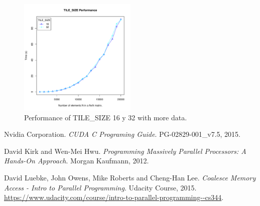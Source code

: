 \documentclass[a4paper,10pt]{scrartcl}
\begin{document}
\begin{enumerate}
 \begin{figure}
 \centering
 \includegraphics[width=0.5\textwidth]{./TilesizePerformance_1K-20K}
 \caption{Performance of TILE\_SIZE 16 y 32 with more data.}\label{fig:NTVsT_50-1K}
 \end{figure}
 
\end{enumerate}

\begin{thebibliography}{9}
Nvidia Corporation.
\textit{CUDA C Programing Guide}. 
PG-02829-001\_v7.5, 2015.
 
David Kirk and Wen-Mei Hwu.
\textit{Programming Massively Parallel Processors: A Hands-On Approach}. 
Morgan Kaufmann, 2012.

David Luebke, John Owens, Mike Roberts and Cheng-Han Lee.
\textit{Coalesce Memory Access - Intro to Parallel Programming}. 
Udacity Course, 2015. \url{https://www.udacity.com/course/intro-to-parallel-programming--cs344}.

\end{thebibliography}
 
\end{document}
